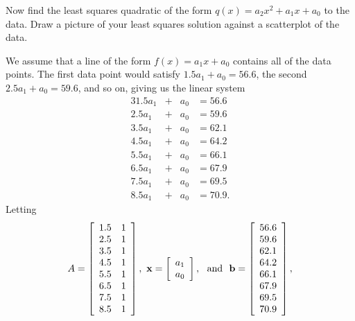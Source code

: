 \begin{example}

		
	\item Now find the least squares quadratic of the form $q(x) = a_2x^2+a_1x+a_0$ to the data. Draw a picture of your least squares solution against a scatterplot of the data. 

	
	\ea
	


\ExampleSolution

	\ba
	\item We assume that a line of the form $f(x) = a_1x+a_0$ contains all of the data points.  The first data point would satisfy $1.5a_1+a_0 = 56.6$, the second $2.5a_1+a_0 = 59.6$, and so on, giving us the linear system
\begin{alignat*}{3}
{1.5}a_1	&{}+{}	&a_0 &{}={} 56.6{} \\ 
{2.5}a_1	&{}+{}	&a_0 &{}={} 59.6{} \\
{3.5}a_1	&{}+{}	&a_0 &{}={} 62.1{} \\
{4.5}a_1	&{}+{}	&a_0 &{}={} 64.2{}  \\
{5.5}a_1	&{}+{}	&a_0 &{}={} 66.1{} \\
{6.5}a_1	&{}+{}	&a_0 &{}={} 67.9{} \\
{7.5}a_1	&{}+{}	&a_0 &{}={} 69.5{} \\
{8.5}a_1	&{}+{}	&a_0 &{}={} 70.9{.}
\end{alignat*}
Letting 
\[A = \left[ \begin{array}{cc} 1.5&1 \\ 2.5&1 \\ 3.5&1 \\ 4.5&1 \\ 5.5&1 \\ 6.5&1 \\ 7.5&1 \\ 8.5&1 \end{array} \right], \ \vx = \left[ \begin{array}{c} a_1\\a_0 \end{array} \right], \ \text{ and } \ \vb=\left[ \begin{array}{c} 56.6\\59.6\\62.1\\64.2\\66.1\\67.9\\69.5\\70.9 \end{array} \right],\]

\end{example}
